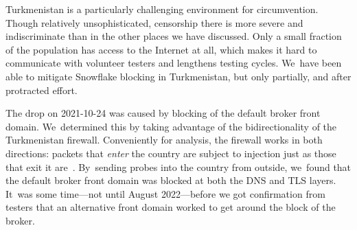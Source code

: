 \documentclass[letterpaper,twocolumn]{article}
\begin{document}
Turkmenistan is a particularly challenging environment for circumvention.
Though relatively unsophisticated, censorship there
is more severe and indiscriminate
than in the other places we have discussed.
Only a small fraction of the population has access to the Internet at all,
which makes it hard to communicate with volunteer testers
and lengthens testing cycles.
We~have been able to mitigate Snowflake blocking in Turkmenistan,
but only partially, and after protracted effort.

The drop on \mbox{2021-10-24} was caused by
blocking of the default broker front domain.
We~determined this by
taking advantage of the bidirectionality of the Turkmenistan firewall.
Conveniently for analysis,
the firewall works in both directions:
packets that \emph{enter} the country are subject to injection
just as those that exit it are~\cite[\S 2]{Nourin2023a}.
By~sending probes into the country from outside,
we~found that the default broker front domain
was blocked at both the DNS and TLS layers.
It~was some time---not until August 2022---before we got
confirmation from testers that an alternative front domain
worked to get around the block of the broker.

\end{document}
